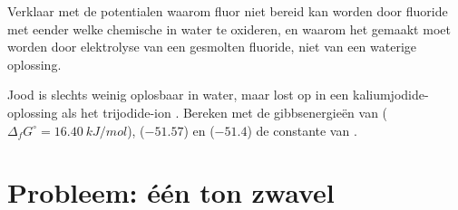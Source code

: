 \begin{exercise}[$\star\star\star$]\label{exo:b1:p-block-16-18:11}
Verklaar met de potentialen waarom fluor niet bereid kan worden door
fluoride met eender welke chemische  in water te oxideren, en
waarom het gemaakt moet worden door elektrolyse van een gesmolten
fluoride, niet van een waterige oplossing.
\end{exercise}

\begin{exercise}[$\star\star\star$]\label{exo:b1:p-block-16-18:12}
Jood is slechts weinig oplosbaar in water, maar lost op in een
kaliumjodide-oplossing als het trijodide-ion . Bereken met de
gibbsenergieën van  ($\Delta_f G^\circ = \qty{16.40}{kJ/mol}$),
 ($-51.57$) en  ($-51.4$) de constante van
.
\end{exercise}

\section{Probleem: één ton zwavel}

